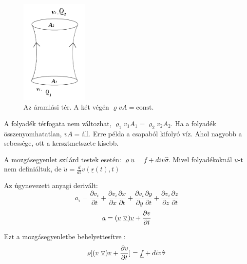 \documentclass[a4paper,titlepage,12pt]{article}
\begin{document}
\begin{figure}[H]
	\begin{center}
		\includegraphics[width=0.3\textwidth]{tetel8.png}
		\caption{Az áramlási tér. A két végén $\varrho vA=\text{const}.$}
	\end{center}
\end{figure}

A folyadék térfogata nem változhat, $\varrho_{1}v_{1}A_{1}=\varrho_{2}v_{2}A_{2}$. Ha a folyadék összenyomhatatlan, $vA=$áll. Erre példa a csapaból kifolyó víz. Ahol nagyobb a sebessége, ott a kersztmetszete kisebb. 

A mozgásegyenlet szilárd testek esetén: $\varrho\underline{\ddot{u}}=\underline{f}+div\hat{\sigma}$. Mivel folyadékoknál $\underline{u}$-t nem definiáltuk, de $\ddot{u}=\frac{d}{dt}v(\underline{r}(t),t) $

\vspace{0.25 cm}
Az úgynevezett anyagi derivált: 
\begin{equation*}
a_{i}=\frac{\partial v_{i}}{\partial t}+\frac{\partial v_{i}}{\partial x}\frac{\partial x}{\partial t}+\frac{\partial v_{i}}{\partial y}\frac{\partial y}{\partial t}+\frac{\partial v_{i}}{\partial z}\frac{\partial z}{\partial t} 
\end{equation*} 
\begin{equation*}
\underline{a}=(\underline{v}\hspace{0.1 cm}\underline{\triangledown})\underline{v}+\frac{\partial v}{\partial t}
\end{equation*}

Ezt a mozgásegyenletbe behelyettesítve : 
\begin{equation*}
\varrho[(\underline{v}\hspace{0.1 cm}\underline{\triangledown})\underline{v}+\frac{\partial v}{\partial t}]=\underline{f}+div\hat{\sigma}
\end{equation*}
\end{document}
